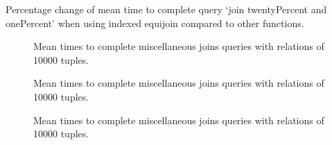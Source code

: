\begin{table}[b]
    \centering
    
    \caption{Percentage change of mean time to complete query `join twentyPercent and onePercent' when using indexed equijoin compared to other functions.}
    \label{tab:percentage-change-of-means-join-twentyPercent-and-onePercent}
\end{table}

\begin{figure}[p]
    
    \caption{Mean times to complete miscellaneous joins queries with relations of 10000 tuples.}
    \label{fig:non-standard-1000}
\end{figure}

\begin{figure}[p]
    
    \caption{Mean times to complete miscellaneous joins queries with relations of 10000 tuples.}
    \label{fig:non-standard-5000}
\end{figure}

\begin{figure}[p]
    
    \caption{Mean times to complete miscellaneous joins queries with relations of 10000 tuples.}
    \label{fig:non-standard-10000}
\end{figure}

